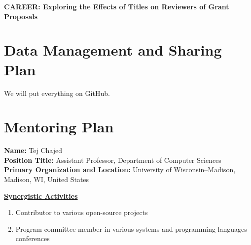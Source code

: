 \documentclass[10pt,letterpaper]{article}
\begin{document}
\noindent
\textbf{CAREER: Exploring the Effects of Titles on Reviewers of Grant Proposals}
\pagestyle{empty}



\newpage
\pagestyle{plain}
\setcounter{page}{1}


\newpage
\pagestyle{empty}



\newpage
\pagestyle{empty}
\section*{Data Management and Sharing Plan}
\setcounter{page}{1}

We will put everything on GitHub.

\newpage
\pagestyle{empty}
\section*{Mentoring Plan}
\setcounter{page}{1}
\lipsum

\newpage
\pagestyle{empty}
\setcounter{page}{1}

\noindent
\textbf{Name:} Tej Chajed \\
\textbf{Position Title:} Assistant Professor, Department of Computer Sciences \\
\textbf{Primary Organization and Location:} University of Wisconsin--Madison, Madison, WI, United States

\vspace{1.5\baselineskip}

\noindent
\textbf{\underline{Synergistic Activities}}
\begin{enumerate}
  \item Contributor to various open-source projects
  \item Program committee member in various systems and programming languages conferences
\end{enumerate}
\end{document}
